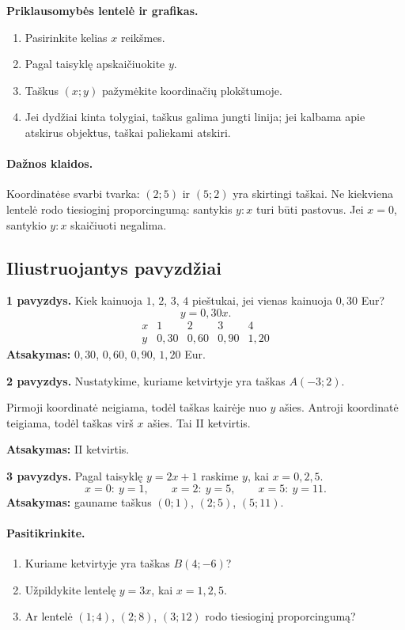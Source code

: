 \textbf{Priklausomybės lentelė ir grafikas.}
\begin{enumerate}[label=\arabic*.]
\item Pasirinkite kelias \(x\) reikšmes.
\item Pagal taisyklę apskaičiuokite \(y\).
\item Taškus \((x;y)\) pažymėkite koordinačių plokštumoje.
\item Jei dydžiai kinta tolygiai, taškus galima jungti linija; jei kalbama apie atskirus objektus, taškai paliekami atskiri.
\end{enumerate}

\paragraph{Dažnos klaidos.}
Koordinatėse svarbi tvarka: \((2;5)\) ir \((5;2)\) yra skirtingi taškai. Ne kiekviena lentelė rodo tiesioginį proporcingumą: santykis \(y:x\) turi būti pastovus. Jei \(x=0\), santykio \(y:x\) skaičiuoti negalima.

\subsection{Iliustruojantys pavyzdžiai}
\textbf{1 pavyzdys.} Kiek kainuoja \(1\), \(2\), \(3\), \(4\) pieštukai, jei vienas kainuoja \(0,30\) Eur?
\[
y=0,30x.
\]
\[
\begin{array}{c|cccc}
x&1&2&3&4\\ \hline
y&0,30&0,60&0,90&1,20
\end{array}
\]
\textbf{Atsakymas:} \(0,30\), \(0,60\), \(0,90\), \(1,20\) Eur.

\textbf{2 pavyzdys.} Nustatykime, kuriame ketvirtyje yra taškas \(A(-3;2)\).

Pirmoji koordinatė neigiama, todėl taškas kairėje nuo \(y\) ašies. Antroji koordinatė teigiama, todėl taškas virš \(x\) ašies. Tai II ketvirtis.

\textbf{Atsakymas:} II ketvirtis.

\textbf{3 pavyzdys.} Pagal taisyklę \(y=2x+1\) raskime \(y\), kai \(x=0,2,5\).
\[
x=0:\ y=1,\qquad x=2:\ y=5,\qquad x=5:\ y=11.
\]
\textbf{Atsakymas:} gauname taškus \((0;1)\), \((2;5)\), \((5;11)\).

\paragraph{Pasitikrinkite.}
\begin{enumerate}[label=\arabic*.]
\item Kuriame ketvirtyje yra taškas \(B(4;-6)\)?
\item Užpildykite lentelę \(y=3x\), kai \(x=1,2,5\).
\item Ar lentelė \((1;4)\), \((2;8)\), \((3;12)\) rodo tiesioginį proporcingumą?
\end{enumerate}

